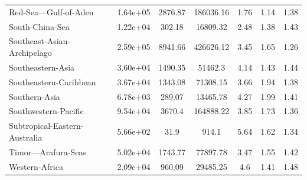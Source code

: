 \begin{table}[H]
{\begin{tabular}{lcccccc}
            \\
            Red-Sea---Gulf-of-Aden                     & 1.64e+05 & 2876.87 &
            186036.16                                  &
            1.76                                       & 1.14     & 1.38
            \\
            South-China-Sea                            & 1.22e+04 & 302.18  &
            16809.32                                   &
            2.48                                       & 1.38     & 1.43
            \\
            Southeast-Asian-Archipelago                & 2.59e+05 & 8941.66 &
            426626.12                                  &
            3.45                                       & 1.65     & 1.26
            \\
            Southeastern-Asia                          & 3.60e+04 & 1490.35 &
            51462.3                                    &
            4.14                                       & 1.43     & 1.44
            \\
            Southeastern-Caribbean                     & 3.67e+04 & 1343.08 &
            71308.15                                   &
            3.66                                       & 1.94     & 1.38
            \\
            Southern-Asia                              & 6.78e+03 & 289.07  &
            13465.78                                   &
            4.27                                       & 1.99     & 1.41
            \\
            Southwestern-Pacific                       & 9.54e+04 & 3670.4  &
            164888.22                                  &
            3.85                                       & 1.73     & 1.36
            \\
            Subtropical-Eastern-Australia              & 5.66e+02 & 31.9    &
            914.1                                      &
            5.64                                       & 1.62     & 1.34
            \\
            Timor---Arafura-Seas                       & 5.02e+04 & 1743.77 &
            77897.78                                   &
            3.47                                       & 1.55     & 1.42
            \\
            Western-Africa                             & 2.09e+04 & 960.09  &
            29485.25                                   &
            4.6                                        & 1.41     & 1.48

\end{tabular}}
\end{table}
